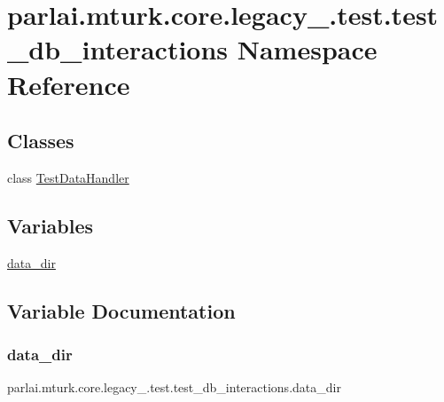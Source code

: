 \hypertarget{namespaceparlai_1_1mturk_1_1core_1_1legacy__2018_1_1test_1_1test__db__interactions}{}\section{parlai.\+mturk.\+core.\+legacy\+\_.\+test.\+test\+\_\+db\+\_\+interactions Namespace Reference}
\label{namespaceparlai_1_1mturk_1_1core_1_1legacy__2018_1_1test_1_1test__db__interactions}
\subsection*{Classes}
\begin{DoxyCompactItemize}
\item 
class \hyperlink{classparlai_1_1mturk_1_1core_1_1legacy__2018_1_1test_1_1test__db__interactions_1_1TestDataHandler}{Test\+Data\+Handler}
\end{DoxyCompactItemize}
\subsection*{Variables}
\begin{DoxyCompactItemize}
\item 
\hyperlink{namespaceparlai_1_1mturk_1_1core_1_1legacy__2018_1_1test_1_1test__db__interactions_ab430e4ea1590be5c12b661c8cdd83f9a}{data\+\_\+dir}
\end{DoxyCompactItemize}


\subsection{Variable Documentation}
\mbox{\label{namespaceparlai_1_1mturk_1_1core_1_1legacy__2018_1_1test_1_1test__db__interactions_ab430e4ea1590be5c12b661c8cdd83f9a}} 
\subsubsection{\texorpdfstring{data\+\_\+dir}{data\_dir}}
{\footnotesize\ttfamily parlai.\+mturk.\+core.\+legacy\+\_.\+test.\+test\+\_\+db\+\_\+interactions.\+data\+\_\+dir}

